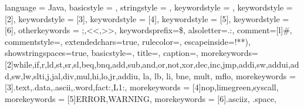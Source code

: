 {
    language = Java,%
    basicstyle = {\LILLYxlstTypeWriter},
    stringstyle = {\color{candypink}},
    keywordstyle = {\color{tealblue}},
    keywordstyle = [2]{\color{purple}},
    keywordstyle = [3]{\color{dgold}},
    keywordstyle = [4]{\color{limegreen}\bfseries},
    keywordstyle = [5]{\color{red}},
    keywordstyle = [6]{\color{tealblue!60!black}},
    otherkeywords = {;,<<,>>},
    keywordsprefix={\$},
    alsoletter={.:},
    comment=[l]{\#},
    commentstyle={\color{gray}\LILLYxlstTypeWriter},
    extendedchars=true,
    rulecolor=\color{white},
    escapeinside={!*}{*)}, 
    showstringspaces=true,  %
    basicstyle=\LILLYxlstTypeWriter,   %
    title={},
    caption={},
    morekeywords=[2]{while,if,r,ld,st,sr,sl,beq,bnq,add,sub,and,or,not,xor,dec,inc,jmp,addi,sw,addui,add,sw,lw,slti,j,jal,div,mul,hi,lo,jr,addiu,
    la, lb, li, bne, mult, mflo},
    morekeywords = [3]{.text,.data,.ascii,.word,fact:,L1:},
    morekeywords = [4]{nop,limegreen,syscall},
    morekeywords = [5]{ERROR,WARNING},
    morekeywords = [6]{.asciiz, .space},
}
